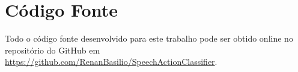 \chapter{Código Fonte}
\label{apdx:src}

Todo o código fonte desenvolvido para este trabalho pode ser obtido online no repositório do GitHub em \url{https://github.com/RenanBasilio/SpeechActionClassifier}.
